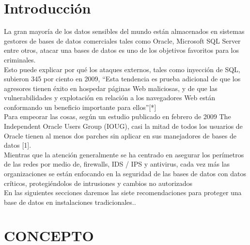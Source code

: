 \documentclass[conference]{IEEEtran}
\begin{document}
\section{Introducci\'on}
La gran mayoría de los datos sensibles del mundo están almacenados en sistemas gestores de bases de datos comerciales tales como Oracle, Microsoft SQL Server entre otros, atacar una bases de datos es uno de los objetivos favoritos para los criminales.
\\
Esto puede explicar por qué los ataques externos, tales como inyección de SQL, subieron 345 por ciento en 2009, “Esta tendencia es prueba adicional de que los agresores tienen éxito en hospedar páginas Web maliciosas, y de que las vulnerabilidades y explotación en relación a los navegadores Web están conformando un beneficio importante para ellos”[*]
\\
Para empeorar las cosas, según un estudio publicado en febrero de 2009 The Independent Oracle Users Group (IOUG), casi la mitad de todos los usuarios de Oracle tienen al menos dos parches sin aplicar en sus manejadores de bases de datos [1].
\\
 Mientras que la atención generalmente se ha centrado en asegurar los perímetros de las redes por medio de, firewalls, IDS / IPS y antivirus, cada vez más las organizaciones se están enfocando en la seguridad de las bases de datos con datos críticos, protegiéndolos de intrusiones y cambios no autorizados
\\
En las siguientes secciones daremos las siete recomendaciones para proteger una base de datos en instalaciones tradicionales..
\\

\section{CONCEPTO}
\end{document}
